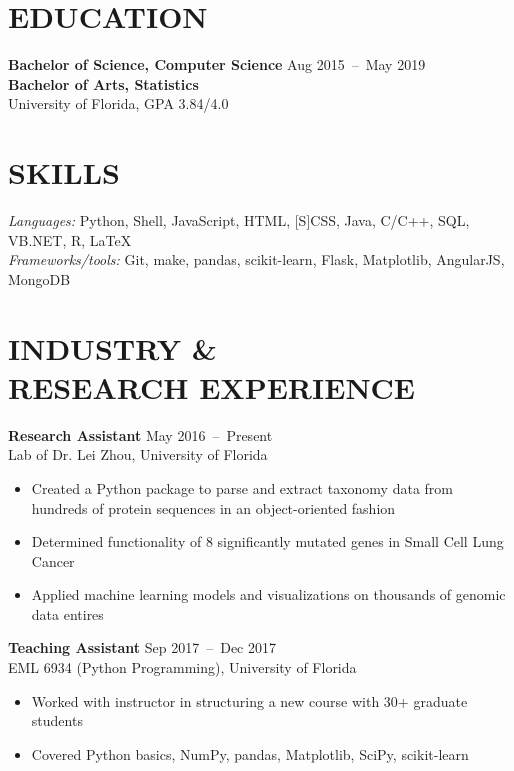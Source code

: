 \documentclass[line,resmargin]{res}
\begin{document}
\address{}
\address{}

\begin{resume}

\section{EDUCATION}
    \textbf{Bachelor of Science, Computer Science}    \hfill Aug 2015~--~May 2019 \\
    \textbf{Bachelor of Arts, Statistics} \\
    University of Florida, GPA 3.84/4.0

\section{SKILLS}
    {\sl Languages:} Python, Shell, JavaScript, HTML, [S]CSS, Java, C/C++, SQL, VB.NET, R, LaTeX \\
    {\sl Frameworks/tools:} Git, make, pandas, scikit-learn, Flask, Matplotlib, AngularJS, MongoDB

\section{INDUSTRY \& \\ RESEARCH EXPERIENCE}
    \textbf{Research Assistant}    \hfill May 2016~--~Present \\
    Lab of Dr. Lei Zhou, University of Florida
    \begin{itemize}  \itemsep -2pt
        \item Created a Python package to parse and extract taxonomy data from hundreds of protein sequences in an object-oriented fashion
        \item Determined functionality of 8 significantly mutated genes in Small Cell Lung Cancer
        \item Applied machine learning models and visualizations on thousands of genomic data entires
    \end{itemize}

    \textbf{Teaching Assistant}    \hfill Sep 2017~--~Dec 2017 \\
    EML 6934 (Python Programming), University of Florida
    \begin{itemize}  \itemsep -2pt
        \item Worked with instructor in structuring a new course with 30+ graduate students
        \item Covered Python basics, NumPy, pandas, Matplotlib, SciPy, scikit-learn
    \end{itemize}


\end{resume}
\end{document}
